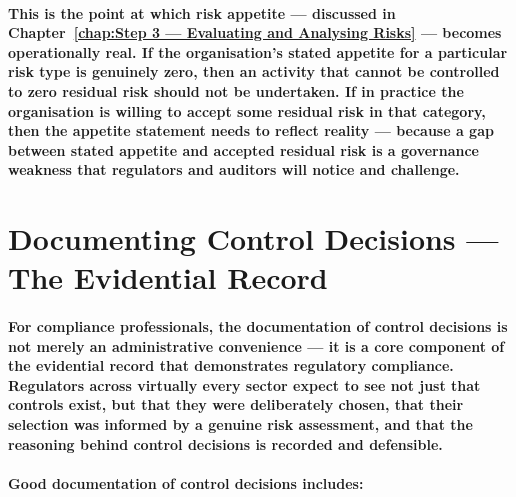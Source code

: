 \paragraph{This is the point at which risk appetite — discussed in Chapter~\ref{chap:Step 3 — Evaluating and Analysing Risks} — becomes operationally real. If the organisation's stated appetite for a particular risk type is genuinely zero, then an activity that cannot be controlled to zero residual risk should not be undertaken. If in practice the organisation is willing to accept some residual risk in that category, then the appetite statement needs to reflect reality — because a gap between stated appetite and accepted residual risk is a governance weakness that regulators and auditors will notice and challenge.}

\section{Documenting Control Decisions — The Evidential Record}
\paragraph{For compliance professionals, the documentation of control decisions is not merely an administrative convenience — it is a core component of the evidential record that demonstrates regulatory compliance. Regulators across virtually every sector expect to see not just that controls exist, but that they were deliberately chosen, that their selection was informed by a genuine risk assessment, and that the reasoning behind control decisions is recorded and defensible.}
\paragraph{Good documentation of control decisions includes:}
\begin{itemize}
\end{itemize}
